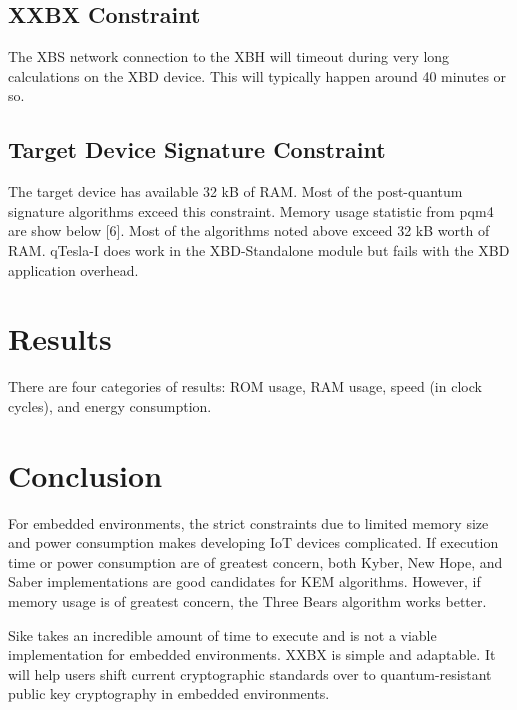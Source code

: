 \documentclass[10pt]{article}
\begin{document}
\subsection{XXBX Constraint}
The XBS network connection to the XBH will timeout during very long calculations on 
the XBD device. This will typically happen around 40 minutes or so.

\subsection{Target Device Signature Constraint}
The target device has available 32 kB of RAM. Most of the post-quantum signature 
algorithms exceed this constraint. Memory usage statistic from pqm4 are show below [6].
Most of the algorithms noted above exceed 32 kB worth of RAM. qTesla-I does work in the 
XBD-Standalone module but fails with the XBD application overhead.

\section{Results}

There are four categories of results: ROM usage, RAM usage, speed (in clock cycles), 
and energy consumption.

\section{Conclusion}

For embedded environments, the strict constraints due to limited memory size and power 
consumption makes developing IoT devices complicated. If execution time or power consumption 
are of greatest concern, both Kyber, New Hope, and Saber implementations are good candidates 
for KEM algorithms. However, if memory usage is of greatest concern, the Three Bears algorithm 
works better.

Sike takes an incredible amount of time to execute and is not a viable implementation for 
embedded environments.
XXBX is simple and adaptable. It will help users shift current cryptographic standards over 
to quantum-resistant public key cryptography in embedded environments.




\end{document}

